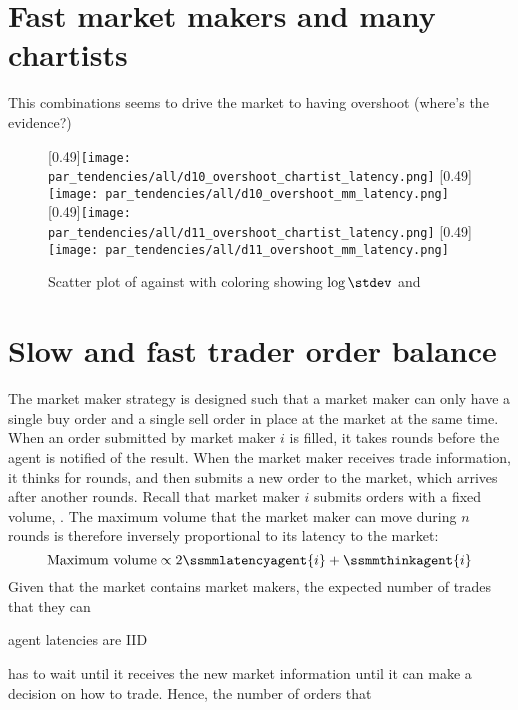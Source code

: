 \section{Fast market makers and many chartists}
This combinations seems to drive the market to having overshoot (where's the evidence?)


\begin{figure}
\centering
{}[0.49\linewidth]{\texttt{[image: par\_tendencies/all/d10\_overshoot\_chartist\_latency.png]}}
[0.49\linewidth]{\texttt{[image: par\_tendencies/all/d10\_overshoot\_mm\_latency.png]}}
[0.49\linewidth]{\texttt{[image: par\_tendencies/all/d11\_overshoot\_chartist\_latency.png]}}
[0.49\linewidth]{\texttt{[image: par\_tendencies/all/d11\_overshoot\_mm\_latency.png]}}
\caption{Scatter plot of \roundstable against \timetoreachnewfundamental with coloring showing $\log \stdev$ and \overshoot}
\label{figure:scatter_fitness_inliers_a}
\end{figure}
\begin{figure}
\centering

\end{figure}

\section{Slow and fast trader order balance}
The market maker strategy is designed such that a market maker can only have a single buy order and a single sell order in place at the market at the same time. When an order submitted by market maker $i$ is filled, it takes  rounds before the agent is notified of the result. When the market maker receives trade information, it thinks for  rounds, and then submits a new order to the market, which arrives after another  rounds. Recall that market maker $i$ submits orders with a fixed volume, . The maximum volume that the market maker can move during $n$ rounds is therefore inversely proportional to its latency to the market:
\[\text{Maximum volume} \propto 2\ssmmlatencyagent{i} + \ssmmthinkagent{i}\]
Given that the market contains \ssmmnAgents market makers, the expected number of trades that they can 

agent latencies are IID

has to wait until it receives the new market information until it can make a decision on how to trade. Hence, the number of orders that 

